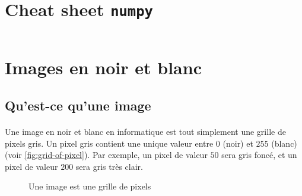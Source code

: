 

\section*{Cheat sheet \texttt{numpy}}

\inputminted{python}{minted/10/cheat_sheet_numpy.py}

\section*{Images en noir et blanc}

\subsection*{Qu'est-ce qu'une image}

\paragraph*{} Une image en noir et blanc en informatique est tout simplement une grille de pixels gris. Un pixel gris contient une unique valeur entre $ 0 $ (noir) et $ 255 $ (blanc) (voir \autoref{fig:grid-of-pixel}). Par exemple, un pixel de valeur $ 50 $ sera gris foncé, et un pixel de valeur $ 200 $ sera gris très clair.

\begin{figure}[h!]
    \begin{center}
    \end{center}
    \caption{Une image est une grille de pixels}
    \label{fig:grid-of-pixel}
\end{figure}

